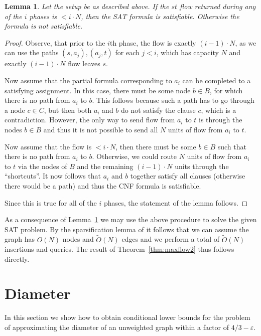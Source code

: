 \documentclass[a4paper,11pt]{article}
\newcommand{\eps}{\varepsilon}
\newcommand{\Ot}{\tilde{O}}
\newtheorem{lemma}{Lemma}
\theoremstyle{definition}
\begin{document}
\begin{lemma}\label{lem:maxflow_correct}
    Let the setup be as described above. If the $st$ flow returned during any
    of the $i$ phases is $< i\cdot N$, then the SAT formula is satisfiable.
    Otherwise the formula is not satisfiable.
\end{lemma}
\begin{proof}
    Observe, that prior to the $i$th phase, the flow is exactly $(i-1)\cdot N$,
    as we can use the paths $(s,a_j), (a_j, t)$ for each $j< i$, which has
    capacity $N$ and exactly $(i-1)\cdot N$ flow leaves $s$.

    Now assume that the partial formula corresponding to $a_i$ can be completed
    to a satisfying assignment. In this case, there must be some node $b\in B$,
    for which there is no path from $a_i$ to $b$. This follows because such a
    path has to go through a node $c\in C$, but then both $a_i$ and $b$ do not
    satisfy the clause $c$, which is a contradiction. However, the only way to
    send flow from $a_i$ to $t$ is through the nodes $b\in B$ and thus it is
    not possible to send all $N$ units of flow from $a_i$ to $t$.

    Now assume that the flow is $<i\cdot N$, then there must be
    some $b\in B$ such that there is no path from $a_i$ to $b$. Otherwise, we
    could route $N$ units of flow from $a_i$ to $t$ via the nodes of $B$ and
    the remaining $(i-1)\cdot N$ units through the ``shortcuts''. It now
    follows that $a_i$ and $b$ together satisfy all clauses (otherwise there
    would be a path) and thus the CNF formula is satisfiable.

    Since this is true for all of the $i$ phases, the statement of the lemma
    follows.
\end{proof}

As a consequence of Lemma~\ref{lem:maxflow_correct} we may use the above
procedure to solve the given SAT problem. By the sparsification lemma of
\cite{ImpagliazzoPZ01} it follows that we can assume the graph has $O(N)$ nodes
and $\Ot(N)$ edges and we perform a total of $\Ot(N)$ insertions and queries.
The result of Theorem~\ref{thm:maxflow2} thus follows directly.


\section{Diameter}
In this section we show how to obtain conditional lower bounds for the problem
of approximating the diameter of an unweighted graph within a factor of
$4/3-\eps$.
\end{document}
